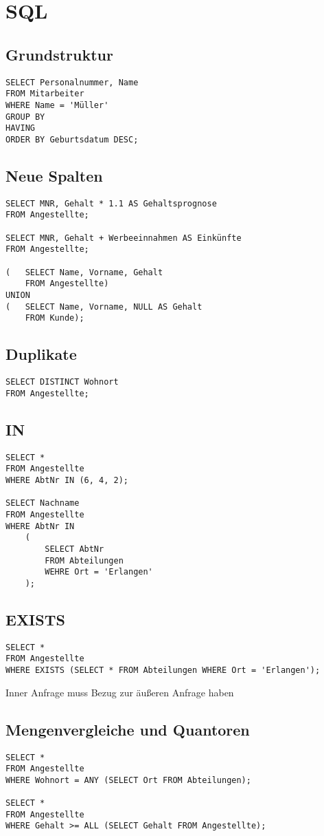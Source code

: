 \section{SQL}
\subsection{Grundstruktur}
\begin{verbatim}
SELECT Personalnummer, Name
FROM Mitarbeiter
WHERE Name = 'Müller'
GROUP BY
HAVING
ORDER BY Geburtsdatum DESC;
\end{verbatim}
\subsection{Neue Spalten}
\begin{verbatim}
SELECT MNR, Gehalt * 1.1 AS Gehaltsprognose
FROM Angestellte;

SELECT MNR, Gehalt + Werbeeinnahmen AS Einkünfte
FROM Angestellte;

(	SELECT Name, Vorname, Gehalt
	FROM Angestellte)
UNION
(	SELECT Name, Vorname, NULL AS Gehalt
	FROM Kunde);
\end{verbatim}
\subsection{Duplikate}
\begin{verbatim}
SELECT DISTINCT Wohnort
FROM Angestellte;
\end{verbatim}
\subsection{IN}
\begin{verbatim}
SELECT * 
FROM Angestellte
WHERE AbtNr IN (6, 4, 2);

SELECT Nachname
FROM Angestellte
WHERE AbtNr IN
	(	
		SELECT AbtNr
		FROM Abteilungen
		WEHRE Ort = 'Erlangen'
	);
\end{verbatim}
\subsection{EXISTS}
\begin{verbatim}
SELECT * 
FROM Angestellte
WHERE EXISTS (SELECT * FROM Abteilungen WHERE Ort = 'Erlangen'); 
\end{verbatim}
Inner Anfrage muss Bezug zur äußeren Anfrage haben
\subsection{Mengenvergleiche und Quantoren}
\begin{verbatim}
SELECT * 
FROM Angestellte
WHERE Wohnort = ANY (SELECT Ort FROM Abteilungen);

SELECT * 
FROM Angestellte
WHERE Gehalt >= ALL (SELECT Gehalt FROM Angestellte);
\end{verbatim}
